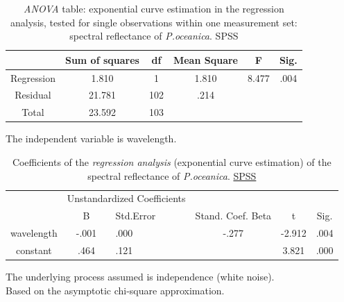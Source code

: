 \documentclass[11pt]{article}
\begin{document}
\begin{appendices}
\begin{table}[htbp]
	\caption{\textit{ANOVA} table: exponential curve estimation in the regression analysis, tested for single observations within one measurement set: spectral reflectance of \textit{P.oceanica}. \ac{SPSS}}
	\begin{center}
		\begin{tabular}{|c|c|c|c| c|c|}
			\hline\hline
			& \textbf{Sum of squares} & \textbf{df} & \textbf{Mean Square} & F & Sig.\\ \hline\hline
			Regression & 1.810 & 1 & 1.810 & 8.477 & .004\\ \hline
			Residual & 21.781 & 102 & .214 & & \\ \hline
			Total & 23.592 & 103 & & & \\ \hline
		\end{tabular}
	\end{center}
	The independent variable is wavelength. 
	\label{tab:6}
\end{table}

\begin{table}[htbp]
	\caption{Coefficients of the \textit{regression analysis} (exponential curve estimation) of the spectral reflectance of \textit{P.oceanica}. \href{http://www.spss.com/}{SPSS}}
	\begin{center}
		\begin{tabular}{| c | c | p{2cm}| c | c | c |}
			\hline\hline
			& \multicolumn{2}{|c|}{Unstandardized Coefficients}\\
			\cline{2-3}
			& B & Std.Error & Stand. Coef. Beta & t & Sig.\\ \hline\hline
			wavelength & -.001 & .000 & -.277 & -2.912 & .004 \\ \hline
			constant & .464 & .121 & & 3.821 & .000 \\ \hline
		\end{tabular}
	\end{center}
	The underlying process assumed is independence (white noise).\\
	 Based on the asymptotic chi-square approximation.
	\label{tab:7}
\end{table}
\pagebreak


\end{appendices}
\end{document}
